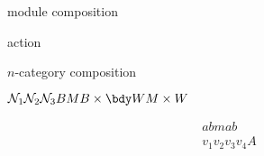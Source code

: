 \documentclass{amsart}
\begin{document}
\thispagestyle{empty}

module composition

action

$n$-category composition

\newcommand{\cN}{\mathcal{N}}
$\cN_1 \cN_2 \cN_3 B M B \times \bdy W M \times W$

\begin{align*}
abmab & \\
v_1 v_2 v_3 v_4 A
\end{align*}
\end{document}
